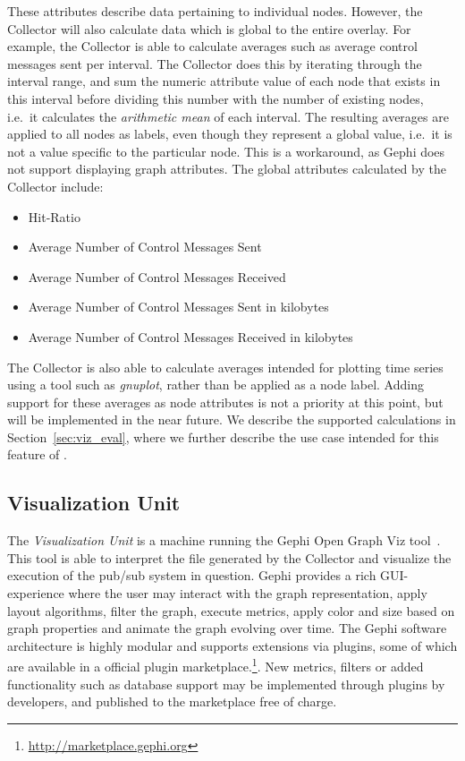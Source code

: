 These attributes describe data pertaining to individual nodes. However,
the Collector will also calculate data which is global to the entire
overlay. For example, the Collector is able to calculate averages such
as average control messages sent per interval. The Collector does this
by iterating through the interval range, and sum the numeric attribute
value of each node that exists in this interval before dividing this
number with the number of existing nodes, i.e.\ it calculates the
\emph{arithmetic mean} of each interval. The resulting averages are
applied to all nodes as labels, even though they represent a global
value, i.e.\ it is not a value specific to the particular node. This is
a workaround, as Gephi does not support displaying graph attributes.
The global attributes calculated by the Collector include:

\begin{itemize}
    \item Hit-Ratio
    \item Average Number of Control Messages Sent
    \item Average Number of Control Messages Received
    \item Average Number of Control Messages Sent in kilobytes
    \item Average Number of Control Messages Received in kilobytes
\end{itemize}

The Collector is also able to calculate averages intended for plotting
time series using a tool such as \emph{gnuplot}, rather than be applied as a
node label. Adding support for these averages as node attributes is not
a priority at this point, but will be implemented in the near future. We
describe the supported calculations in Section~\ref{sec:viz_eval}, where
we further describe the use case intended for this feature of \demo.

\subsection{Visualization Unit}
\label{sec:viz_unit}

The \emph{Visualization Unit} is a machine running the Gephi Open Graph
Viz tool~\cite{ICWSM09154}. This tool is able to interpret the \gexf{} file generated by
the Collector and visualize the execution of the pub/sub system in
question. Gephi provides a rich GUI-experience where the user may
interact with the graph representation, apply layout algorithms, filter
the graph, execute metrics, apply color and size based on graph
properties and animate the graph evolving over time. The Gephi software
architecture is highly modular and supports extensions via plugins, some
of which are available in a official plugin
marketplace.\footnote{\url{http://marketplace.gephi.org}}. New metrics,
filters or added functionality such as database support may be
implemented through plugins by developers, and published to the
marketplace free of charge.

